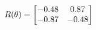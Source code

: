 \documentclass[preview]{standalone}
\begin{document}
\begin{align*}
\special{dvisvgm:raw <g id='unique000'>}R(\theta) = \begin{bmatrix}-0.48 & 0.87\\-0.87 & -0.48\end{bmatrix}\special{dvisvgm:raw </g>}
\end{align*}
\end{document}
